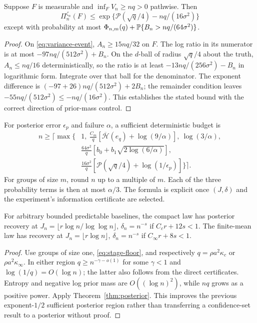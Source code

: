 \begin{theorem}
\label{thm:posterior}
Suppose $F$ is measurable and $\inf_F V_n\ge nq>0$ pathwise. Then
\begin{equation}
 \Pi_n^{\zeta_n}(F)\le
 \exp\{\mathcal P(\sqrt q/4)-nq/(16\sigma^2)\}
 \label{eq:new-posterior}
\end{equation}
except with probability at most
$\Phi_{n,m}(q)+\mathbb P\{B_n>nq/(64\sigma^2)\}$.
\end{theorem}
\begin{proof}
On \eqref{eq:variance-event}, $A_n\ge15nq/32$ on $F$. The log ratio in its
numerator is at most $-97nq/(512\sigma^2)+B_n$.
On the $d$-ball of radius $\sqrt q/4$ about the truth, $A_n\le nq/16$
deterministically, so the ratio is at least
$-13nq/(256\sigma^2)-B_n$ in logarithmic form.
Integrate over that ball for the denominator. The exponent difference is
$(-97+26)nq/(512\sigma^2)+2B_n$; the remainder condition leaves
$-55nq/(512\sigma^2)\le-nq/(16\sigma^2)$.
This establishes the stated bound with the correct direction of prior-mass control.
\end{proof}

For posterior error $\epsilon_p$ and failure $\alpha$, a sufficient deterministic
budget is
\begin{equation}
 \begin{split}
 n\ge\Big\lceil\max\Big\{&1,\ \frac{C_m}{q}
 [\overline{\mathcal H}(e_q)+\log(9/\alpha)],\ \log(3/\alpha),\\
 &\frac{64\sigma^2}{q}[b_0+b_1\sqrt{2\log(6/\alpha)}],\\
 &\frac{16\sigma^2}{q}[\mathcal P(\sqrt q/4)+\log(1/\epsilon_p)]
 \Big\}\Big\rceil.
 \end{split}
 \label{eq:new-budget}
\end{equation}
For groups of size $m$, round $n$ up to a multiple of $m$. Each of the three
probability terms is then at most $\alpha/3$. The formula is explicit once
$(J,\delta)$ and the experiment's information certificate are selected.

\begin{corollary}
\label{cor:stage-rates}
For arbitrary bounded predictable baselines, the compact law has posterior
recovery at $J_n=\lfloor r\log n/\log\log n\rfloor$, $\delta_n=n^{-s}$ if
$C_c r+12s<1$. The finite-mean law has recovery at
$J_n=\lfloor r\log n\rfloor$, $\delta_n=n^{-s}$ if $C_\infty r+8s<1$.
\end{corollary}
\begin{proof}
Use groups of size one, \eqref{eq:stage-floor}, and respectively
$q=\rho a^2\kappa_c$ or $\rho a^2\kappa_\infty$.
In either region $q\ge n^{-\gamma-o(1)}$ for some $\gamma<1$ and
$\log(1/q)=O(\log n)$; the latter also follows from the direct certificates.
Entropy and negative log prior mass are $O((\log n)^2)$, while $nq$ grows
as a positive power. Apply Theorem~\ref{thm:posterior}. This improves the
previous exponent-$1/2$ sufficient posterior region rather than transferring
a confidence-set result to a posterior without proof.
\end{proof}
